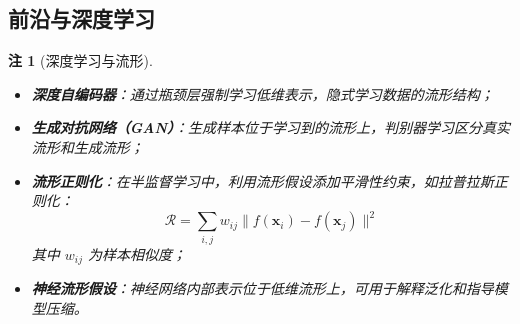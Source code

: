 \documentclass[UTF8, 10pt]{ctexart}
\newtheorem{remark}{注}[section]
\begin{document}
\subsection{前沿与深度学习}
\begin{remark}[深度学习与流形]
\begin{itemize}
    \item \textbf{深度自编码器}：通过瓶颈层强制学习低维表示，隐式学习数据的流形结构；
    \item \textbf{生成对抗网络（GAN）}：生成样本位于学习到的流形上，判别器学习区分真实流形和生成流形；
    \item \textbf{流形正则化}：在半监督学习中，利用流形假设添加平滑性约束，如拉普拉斯正则化：
    \[
    \mathcal{R} = \sum_{i,j} w_{ij} \|f(\bm{x}_i) - f(\bm{x}_j)\|^2
    \]
    其中 $w_{ij}$ 为样本相似度；
    \item \textbf{神经流形假设}：神经网络内部表示位于低维流形上，可用于解释泛化和指导模型压缩。
\end{itemize}
\end{remark}
\end{document}
